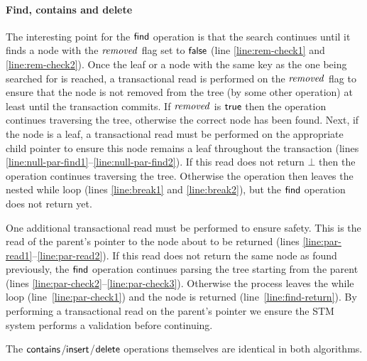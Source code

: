 \paragraph{Find, contains and delete}
The interesting point for the $\act{find}$ operation is that the search continues until it finds a node with the $\ms{removed}$ flag set to $\lit{false}$
(line \ref{line:rem-check1} and \ref{line:rem-check2}).
Once the leaf or a node with the same key as the one being searched for is reached, a transactional read is performed on the $\ms{removed}$ flag to
ensure that the node is not removed from the tree (by some other operation) at least until the transaction commits.
If $\ms{removed}$ is $\lit{true}$ then the operation continues traversing the tree, otherwise 
the correct node has been found.
Next, if the node is a leaf, a transactional read must be performed on the appropriate child pointer to ensure this node remains a leaf throughout
the transaction (lines \ref{line:null-par-find1}--\ref{line:null-par-find2}).
If this read does not return $\bot$ then the operation continues traversing the tree.
Otherwise the operation then leaves the nested while loop 
(lines \ref{line:break1} and \ref{line:break2}), but the $\act{find}$ operation does not return yet.

One additional transactional read must be performed to ensure safety.
This is the read of the parent's pointer to the node about to be returned (lines \ref{line:par-read1}--\ref{line:par-read2}).
If this read does not return the same node as found previously, the $\act{find}$ operation continues parsing the tree 
starting from the parent (lines \ref{line:par-check2}--\ref{line:par-check3}).
Otherwise the process leaves the while loop (line~\ref{line:par-check1}) and the node is returned (line~\ref{line:find-return}).
By performing a transactional read on the parent's pointer we ensure the STM system performs a validation before continuing.

The $\act{contains}$/$\act{insert}$/$\act{delete}$ operations themselves are identical in both algorithms.


